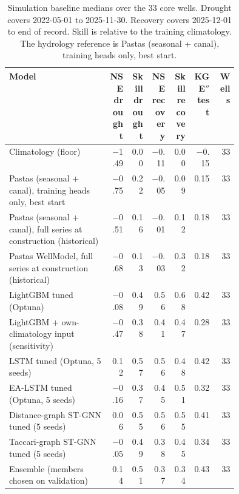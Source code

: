 \begin{table}[p]
\centering
\scriptsize
\setlength{\tabcolsep}{3pt}
\caption{Simulation baseline medians over the 33 core wells. Drought covers 2022-05-01 to 2025-11-30. Recovery covers 2025-12-01 to end of record. Skill is relative to the training climatology. The hydrology reference is Pastas (seasonal + canal), training heads only, best start.}
\label{tab:baselines-simulation}
\begin{tabular}{@{}p{0.44\linewidth}rrrrrr@{}}
\toprule
Model & \shortstack{NSE\\drought} & \shortstack{Skill\\drought} & \shortstack{NSE\\recovery} & \shortstack{Skill\\recovery} & \shortstack{KGE$''$\\test} & Wells \\
\midrule
Climatology (floor) & \num{-1.49} & \num{0.00} & \num{-0.11} & \num{0.00} & \num{-0.15} & \num{33} \\
Pastas (seasonal + canal), training heads only, best start & \num{-0.75} & \num{0.22} & \num{-0.05} & \num{0.09} & \num{0.15} & \num{33} \\
Pastas (seasonal + canal), full series at construction (historical) & \num{-0.51} & \num{0.16} & \num{-0.01} & \num{0.12} & \num{0.18} & \num{33} \\
Pastas WellModel, full series at construction (historical) & \num{-0.68} & \num{0.13} & \num{-0.03} & \num{0.32} & \num{0.18} & \num{33} \\
LightGBM tuned (Optuna) & \num{-0.08} & \num{0.49} & \num{0.56} & \num{0.68} & \num{0.42} & \num{33} \\
LightGBM + own-climatology input (sensitivity) & \num{-0.47} & \num{0.38} & \num{0.41} & \num{0.47} & \num{0.28} & \num{33} \\
LSTM tuned (Optuna, 5 seeds) & \num{0.12} & \num{0.57} & \num{0.56} & \num{0.48} & \num{0.42} & \num{33} \\
EA-LSTM tuned (Optuna, 5 seeds) & \num{-0.16} & \num{0.37} & \num{0.45} & \num{0.51} & \num{0.32} & \num{33} \\
Distance-graph ST-GNN tuned (5 seeds) & \num{0.06} & \num{0.55} & \num{0.56} & \num{0.55} & \num{0.41} & \num{33} \\
Taccari-graph ST-GNN tuned (5 seeds) & \num{-0.05} & \num{0.49} & \num{0.38} & \num{0.45} & \num{0.34} & \num{33} \\
Ensemble (members chosen on validation) & \num{0.14} & \num{0.51} & \num{0.37} & \num{0.34} & \num{0.43} & \num{33} \\
\bottomrule
\end{tabular}
\end{table}
